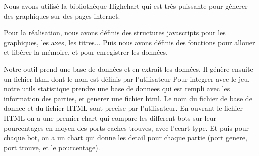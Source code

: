 Nous avons utilisé la bibliothèque Highchart qui est très puissante pour génerer des graphiques sur des pages internet. 

Pour la réalisation, nous avons définis des structures javascripts pour les graphiques, les axes, les titres... Puis nous avons définis des fonctions pour allouer et libérer la mémoire, et pour enregistrer les données. 

Notre outil prend une base de données et en extrait les données. Il génère ensuite un fichier html dont le nom est définis par l'utilisateur
Pour integrer avec le jeu, notre utils statistique prendre une base de donnees qui est rempli avec les information des parties, et generer une fichier html. Le nom du fichier de base de donnee et du fichier HTML sont precise par l'utilisateur. En ouvrant le fichier HTML on a une premier chart qui compare les different bots sur leur pourcentages en moyen des ports caches trouves, avec l'ecart-type. Et puis pour chaque bot, on a un chart qui donne les detail pour chaque partie (port genere, port trouve, et le pourcentage). 
